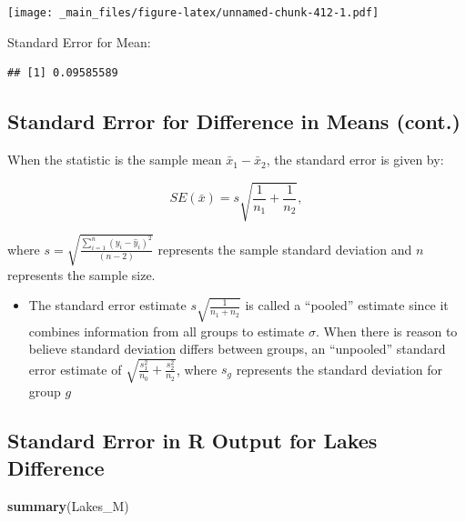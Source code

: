 \documentclass[]{book}
\newenvironment{Shaded}{\begin{snugshade}}{\end{snugshade}}
\newcommand{\KeywordTok}[1]{\textcolor[rgb]{0.13,0.29,0.53}{\textbf{#1}}}
\newcommand{\StringTok}[1]{\textcolor[rgb]{0.31,0.60,0.02}{#1}}
\newcommand{\OperatorTok}[1]{\textcolor[rgb]{0.81,0.36,0.00}{\textbf{#1}}}
\newcommand{\NormalTok}[1]{#1}
\providecommand{\tightlist}{%
  \setlength{\itemsep}{0pt}\setlength{\parskip}{0pt}}
\begin{document}
\texttt{[image: \_main\_files/figure-latex/unnamed-chunk-412-1.pdf]}

Standard Error for Mean:

\begin{Shaded}
\end{Shaded}

\begin{verbatim}
## [1] 0.09585589
\end{verbatim}

\subsection{Standard Error for Difference in Means
(cont.)}\label{standard-error-for-difference-in-means-cont.}

When the statistic is the sample mean \(\bar{x}_1-\bar{x}_2\), the
standard error is given by:

\[
SE(\bar{x})=s\sqrt{\frac{1}{n_1}+\frac{1}{n_2}}, 
\]

where
\(s=\sqrt{\frac{\displaystyle\sum_{i=1}^n(y_i-\hat{y}_i)^2}{(n-2)}}\)
represents the sample standard deviation and \(n\) represents the sample
size.

\begin{itemize}
\tightlist
\item
  The standard error estimate \(s\sqrt{\frac{1}{n_1+n_2}}\) is called a
  ``pooled'' estimate since it combines information from all groups to
  estimate \(\sigma\). When there is reason to believe standard
  deviation differs between groups, an ``unpooled'' standard error
  estimate of \(\sqrt{\frac{s_1^2}{n_0}+\frac{s_2^2}{n_2}}\), where
  \(s_g\) represents the standard deviation for group \(g\)
\end{itemize}

\subsection{Standard Error in R Output for Lakes
Difference}\label{standard-error-in-r-output-for-lakes-difference}

\begin{Shaded}
\begin{Highlighting}[]
\KeywordTok{summary}\NormalTok{(Lakes_M)}
\end{Highlighting}
\end{Shaded}
\end{document}
